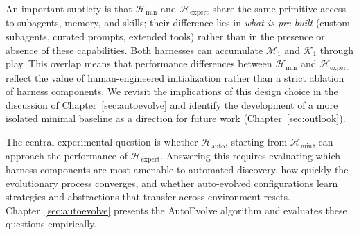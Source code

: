 An important subtlety is that $\mathcal{H}_{\min}$ and $\mathcal{H}_{\text{expert}}$ share the same primitive access to subagents, memory, and skills; their difference lies in \emph{what is pre-built} (custom subagents, curated prompts, extended tools) rather than in the presence or absence of these capabilities. Both harnesses can accumulate $\mathcal{M}_1$ and $\mathcal{K}_1$ through play. This overlap means that performance differences between $\mathcal{H}_{\min}$ and $\mathcal{H}_{\text{expert}}$ reflect the value of human-engineered initialization rather than a strict ablation of harness components. We revisit the implications of this design choice in the discussion of Chapter~\ref{sec:autoevolve} and identify the development of a more isolated minimal baseline as a direction for future work (Chapter~\ref{sec:outlook}).

The central experimental question is whether $\mathcal{H}_{\text{auto}}$, starting from $\mathcal{H}_{\min}$, can approach the performance of $\mathcal{H}_{\text{expert}}$. Answering this requires evaluating which harness components are most amenable to automated discovery, how quickly the evolutionary process converges, and whether auto-evolved configurations learn strategies and abstractions that transfer across environment resets. Chapter~\ref{sec:autoevolve} presents the AutoEvolve algorithm and evaluates these questions empirically.

